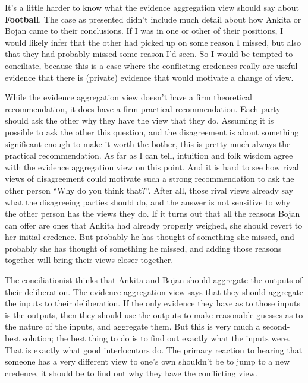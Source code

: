 \documentclass[
  10pt,
  letterpaper,
  twoside]{scrbook}
\begin{document}
It's a little harder to know what the evidence aggregation view should
say about \textbf{Football}. The case as presented didn't include much
detail about how {Ankita} or {Bojan} came to their conclusions. If I was
in one or other of their positions, I would likely infer that the other
had picked up on some reason I missed, but also that they had probably
missed some reason I'd seen. So I would be tempted to conciliate,
because this is a case where the conflicting credences really are useful
evidence that there is (private) evidence that would motivate a change
of view.

While the evidence aggregation view doesn't have a firm theoretical
recommendation, it does have a firm practical recommendation. Each party
should ask the other why they have the view that they do. Assuming it is
possible to ask the other this question, and the disagreement is about
something significant enough to make it worth the bother, this is pretty
much always the practical recommendation. As far as I can tell,
intuition and folk wisdom agree with the evidence aggregation view on
this point. And it is hard to see how rival views of disagreement could
motivate such a strong recommendation to ask the other person ``Why do
you think that?''. After all, those rival views already say what the
disagreeing parties should do, and the answer is not sensitive to why
the other person has the views they do. If it turns out that all the
reasons {Bojan} can offer are ones that {Ankita} had already properly
weighed, she should revert to her initial credence. But probably he has
thought of something she missed, and probably she has thought of
something he missed, and adding those reasons together will bring their
views closer together.

The conciliationist thinks that {Ankita} and {Bojan} should aggregate
the outputs of their deliberation. The evidence aggregation view says
that they should aggregate the inputs to their deliberation. If the only
evidence they have as to those inputs is the outputs, then they should
use the outputs to make reasonable guesses as to the nature of the
inputs, and aggregate them. But this is very much a second-best
solution; the best thing to do is to find out exactly what the inputs
were. That is exactly what good interlocutors do. The primary reaction
to hearing that someone has a very different view to one's own shouldn't
be to jump to a new credence, it should be to find out why they have the
conflicting view.
\end{document}
